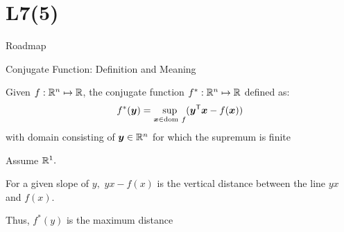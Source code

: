 \documentclass[handout,fleqn,aspectratio=169]{beamer}
\begin{document}
\section{L7(5)}
\begin{frame}{Roadmap}

\plitemsep 0.1in

\bce[(1)] 

\item {} 
\item {} 

\item {}
\item {} 
\item {}


\ece
\end{frame}


\begin{frame}{Conjugate Function: Definition and Meaning}

\plitemsep 0.1in

\bci 

\item Given $f: {\mathbb R}^{n} \mapsto {\mathbb R}$, the {\blue conjugate function}
$f^{*}:{\mathbb R}^{n} \mapsto {\mathbb R}$ defined as:
\[
f^{*}(\vy) = \sup_{\vx\in\text{dom} \ f}(\trans{\vy}\vx-f(\vx))
\]
with domain consisting of $\bm{y}\in{\mathbb R}^{n}$ for which the supremum
is finite

\eci

{
\small
\bci
\item Assume ${\mathbb R}^1.$
\item For a given slope of $y,$ $yx-f(x)$ is the vertical distance between the line $yx$ and $f(x).$
\item Thus, $f^*(y)$ is the maximum distance
\eci
}
{
}

\end{frame}
\end{document}
